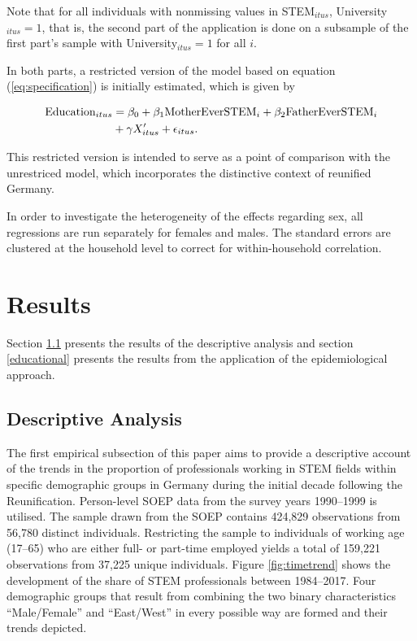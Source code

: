 \documentclass[a4paper, oneside, hyperfootnotes = false]{article}
\begin{document}
{Note that for all individuals with nonmissing values in STEM$_{itus}$, University$_{itus} = 1$, that is, the second part of the application is done on a subsample of the first part's sample with University$_{itus} = 1$ for all $i$.

In both parts, a restricted version of the model based on equation (\ref{eq:specification}) is initially estimated, which is given by

\vspace{-8mm}

\begin{equation}
	\begin{split}
		\label{eq:specificationrestr}
		\textnormal{Education}_{itus} &={} \beta_{0} + \beta_{1}\textnormal{MotherEverSTEM}_{i} + \beta_{2}\textnormal{FatherEverSTEM}_{i} \\
		& + \gamma{}X'_{itus} + \epsilon_{itus}\textnormal{.}
	\end{split}
\end{equation}

This restricted version is intended to serve as a point of comparison with the unrestriced model, which incorporates the distinctive context of reunified Germany.

In order to investigate the heterogeneity of the effects regarding sex, all regressions are run separately for females and males.
The standard errors are clustered at the household level to correct for within-household correlation.

\section{Results}
\label{results}

Section \ref{descriptives} presents the results of the descriptive analysis and section \ref{educational} presents the results from the application of the epidemiological approach.

\subsection{Descriptive Analysis}
\label{descriptives}

The first empirical subsection of this paper aims to provide a descriptive account of the trends in the proportion of professionals working in STEM fields within specific demographic groups in Germany during the initial decade following the Reunification.
Person-level SOEP data from the survey years 1990--1999 is utilised.
The sample drawn from the SOEP contains 424,829 observations from 56,780 distinct individuals.
Restricting the sample to individuals of working age (17--65) who are either full- or part-time employed yields a total of 159,221 observations from 37,225 unique individuals.
Figure \ref{fig:timetrend} shows the development of the share of STEM professionals between 1984--2017.
Four demographic groups that result from combining the two binary characteristics ``Male/Female'' and ``East/West'' in every possible way are formed and their trends depicted.

}
\end{document}
